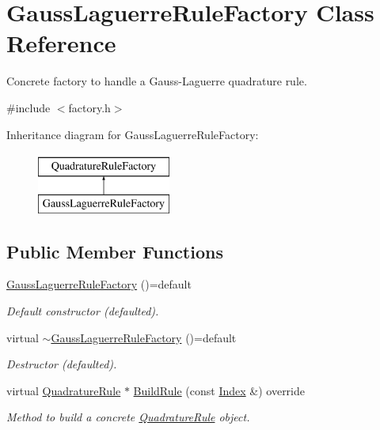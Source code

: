 \hypertarget{classGaussLaguerreRuleFactory}{\section{Gauss\-Laguerre\-Rule\-Factory Class Reference}
\label{classGaussLaguerreRuleFactory}
}


Concrete factory to handle a Gauss-\/\-Laguerre quadrature rule.  




{\ttfamily \#include $<$factory.\-h$>$}

Inheritance diagram for Gauss\-Laguerre\-Rule\-Factory\-:\begin{figure}[H]
\begin{center}
\leavevmode
\includegraphics[height=2.000000cm]{classGaussLaguerreRuleFactory}
\end{center}
\end{figure}
\subsection*{Public Member Functions}
\begin{DoxyCompactItemize}
\item 
\hypertarget{classGaussLaguerreRuleFactory_aec92163584eea1e9fdc921afdfafba2e}{\hyperlink{classGaussLaguerreRuleFactory_aec92163584eea1e9fdc921afdfafba2e}{Gauss\-Laguerre\-Rule\-Factory} ()=default}\label{classGaussLaguerreRuleFactory_aec92163584eea1e9fdc921afdfafba2e}

\begin{DoxyCompactList}\small\item\em Default constructor (defaulted). \end{DoxyCompactList}\item 
\hypertarget{classGaussLaguerreRuleFactory_a8d39539bf7e6dd34cc298cf8c58060c8}{virtual \hyperlink{classGaussLaguerreRuleFactory_a8d39539bf7e6dd34cc298cf8c58060c8}{$\sim$\-Gauss\-Laguerre\-Rule\-Factory} ()=default}\label{classGaussLaguerreRuleFactory_a8d39539bf7e6dd34cc298cf8c58060c8}

\begin{DoxyCompactList}\small\item\em Destructor (defaulted). \end{DoxyCompactList}\item 
virtual \hyperlink{classQuadratureRule}{Quadrature\-Rule} $\ast$ \hyperlink{classGaussLaguerreRuleFactory_a1e907a5209041516fa18c86c79fb1ec6}{Build\-Rule} (const \hyperlink{typedefs_8h_a2c726f8f32697958e9d6c2afecda531d}{Index} \&) override
\begin{DoxyCompactList}\small\item\em Method to build a concrete \hyperlink{classQuadratureRule}{Quadrature\-Rule} object. \end{DoxyCompactList}\end{DoxyCompactItemize}


